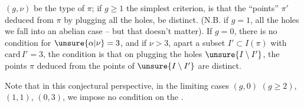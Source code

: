  $(g,\nu)$ be the type of $\pi$;  if $g\geq1$ the simplest criterion, is that the ``\inserted{$\Gamma^{\natural}$-}points''  $\pi'$ deduced from $\pi$ by plugging all the holes, be distinct.  (N.B. if $g=1$,    all the holes we fall into an abelian case -- but that doesn't matter). If $g=0$,  there is no condition for $\unsure{\alpha|\nu}=3$, and if $\nu>3$,  apart a  subset $I'\subset I(\pi)$ with $\mathrm{card}\,I'=3$, the condition is that on plugging the holes  $\unsure{I\setminus I'}$, the \inserted{$\Gamma^{\natural}$-}points  $\pi$ deduced from the points of $\unsure{I\setminus I'}$ are distinct.

Note that in this conjectural perspective, in the limiting cases $(g,0)$ $(g\geq2)$, $(1,1)$, $(0,3)$, we impose no  condition on the .

